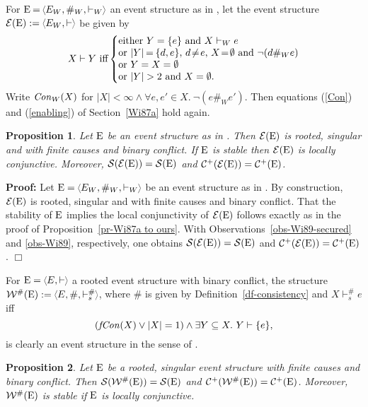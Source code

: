 \documentclass[twocolumn]{article}
\newtheorem{prop}{Proposition}[section]
\newenvironment{proposition}[1]{\begin{prop} \rm \label{pr-#1} }{\end{prop}}
\newenvironment{proof}{\begin{trivlist} \item[\hspace{\labelsep}\bf
Proof:]}{\hfill $\Box$\end{trivlist}}
\newcommand{\df}[1]{Definition~\ref{df-#1}}
\newcommand{\pr}[1]{Proposition~\ref{pr-#1}}
\newcommand{\turn}{\vdash}                              \newcommand{\dbigcup}{\bigcup_{\uparrow}}		\newcommand{\nbigcup}{\bigcup_{\bullet}}		\newcommand{\nbigcap}{\bigcap_{\bullet}}		\newcommand{\bbigcup}{\overline{\bigcup}}		\newcommand{\bbigcap}{\overline{\bigcap}}		\newcommand{\nbbigcap}{\bbigcap_{\bullet}}		\newcommand{\fbbigcup}{\overline{\bigcup}^f}		\newcommand{\bbbigcup}{\overline{\bigcup}^2}		\newcommand{\dcup}{~~\makebox[0pt]{\LARGE$\cdot$}\makebox[0pt]{$\cup$}~~}
\begin{document}
For $\eE \mathbin= \tuple{E_W,\#_W,\turn_W\;}$ an event structure as in
\cite{Wi89}, let the event structure $\fE(\eE) := \tuple{E_W, \turn\;}$
be given by $$X \turn Y \mbox {~iff} \left\{\begin{array}{@{}l@{}}
\mbox{either $Y=\{e\}$ and $X \turn_W e$} \\
\mbox{or $|Y| \hspace{-.8pt}=\hspace{-.8pt} \{d,e\}$, $d \!\neq\! e$,
$X \!=\! \emptyset$ and $\neg(d \#_W e)$} \\
\mbox{or $Y=X=\emptyset$}\\
\mbox{or $|Y|>2$ and $X=\emptyset$.} \end{array}\right.$$
Write ${\it Con}_W(X)$ for $|X|<\infty\wedge\forall e,e' \in X.~\neg (e
\#_W e')$.
Then equations (\ref{Con}) and (\ref{enabling}) of Section~\ref{Wi87a} hold again.

\begin{proposition}{Wi89 to ours}
Let ${\rm E}$ be an event structure as in \cite{Wi89}. Then
${\cal E}({\rm E})$ is rooted, singular and with finite causes and binary
conflict. If ${\rm E}$ is stable then ${\cal E}({\rm E})$ is locally conjunctive.
Moreover, ${\cal S}({\cal E}({\rm E})) = {\cal S}({\rm E})$ and ${\cal C}^+({\cal E}({\rm E})) = {\cal C}^+({\rm E})$.
\end{proposition}

\begin{proof} Let $\eE=\tuple{E_W,\#_W,\turn_W\;}$ be an event
structure as in \cite{Wi89}. By construction, ${\cal E}({\rm E})$ is rooted,
singular and with finite causes and binary conflict.  That the
stability of ${\rm E}$ implies the local conjunctivity of ${\cal E}({\rm E})$
follows exactly as in the proof of \pr{Wi87a to ours}.  With
Observations~\ref{obs-Wi89-secured} and \ref{obs-Wi89}, respectively,
one obtains ${\cal S}({\cal E}({\rm E})) = {\cal S}({\rm E})$ and ${\cal C}^+({\cal E}({\rm E})) = {\cal C}^+({\rm E})$.
\end{proof}
For $\eE=\tuple{E,\turn\;}$ a rooted event structure with binary
conflict, the structure ${\cal W}^\#(\eE):=\tuple{E,\#,\turn_s^\#\;}$,
where $\#$ is given by \df{consistency} and
 $X \turn_s^\# e$ iff
$$(\fCon(X) \vee |X|=1) \wedge \exists Y \subseteq X.~Y \turn \{e\},$$
is clearly an event structure in the sense of \cite{Wi89}.
\begin{proposition}{ours to Wi89}
Let ${\rm E}$ be a rooted, singular event structure with finite causes and
binary conflict. Then ${\cal S}({\cal W}^\#({\rm E})) = {\cal S}({\rm E})$
and ${\cal C}^+({\cal W}^\#({\rm E})) = {\cal C}^+({\rm E})$.
Moreover, ${\cal W}^\#({\rm E})$ is stable if ${\rm E}$ is locally conjunctive.
\end{proposition}
\end{document}
